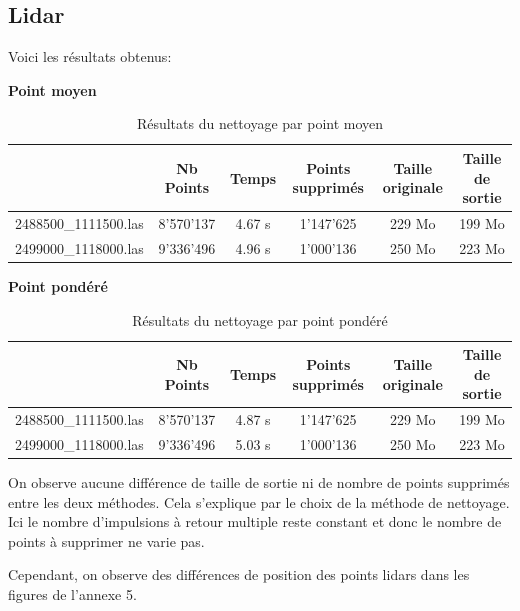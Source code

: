 \subsection{Lidar}
Voici les résultats obtenus:

\textbf{Point moyen}

\begin{table}[htb!]
\begin{tabular}{l|c|c|c|c|c|}
\cline{2-6}
\multicolumn{1}{c|}{}                      & Nb Points & Temps  & Points supprimés & Taille originale & Taille de sortie \\ \hline
\multicolumn{1}{|l|}{2488500\_1111500.las} & 8'570'137 & 4.67 s & 1'147'625        & 229 Mo          & 199 Mo           \\ \hline
\multicolumn{1}{|l|}{2499000\_1118000.las} & 9'336'496 & 4.96 s & 1'000'136        & 250 Mo          & 223 Mo           \\ \hline
\end{tabular}
\caption{Résultats du nettoyage par point moyen}
\label{tab:las_cleaning_avg}
\end{table}

\textbf{Point pondéré}

\begin{table}[htb!]
\begin{tabular}{l|c|c|c|c|c|}
\cline{2-6}
\multicolumn{1}{c|}{}                      & Nb Points & Temps  & Points supprimés & Taille originale & Taille de sortie \\ \hline
\multicolumn{1}{|l|}{2488500\_1111500.las} & 8'570'137 & 4.87 s & 1'147'625        & 229 Mo          & 199 Mo           \\ \hline
\multicolumn{1}{|l|}{2499000\_1118000.las} & 9'336'496 & 5.03 s & 1'000'136        & 250 Mo          & 223 Mo           \\ \hline
\end{tabular}
\caption{Résultats du nettoyage par point pondéré}
\label{tab:las_cleaning_ponderated}
\end{table}

On observe aucune différence de taille de sortie ni de nombre de points supprimés entre les deux méthodes.
Cela s'explique par le choix de la méthode de nettoyage.
Ici le nombre d'impulsions à retour multiple reste constant et donc le nombre de points à supprimer ne varie pas.

Cependant, on observe des différences de position des points lidars dans les figures de l'annexe 5.

